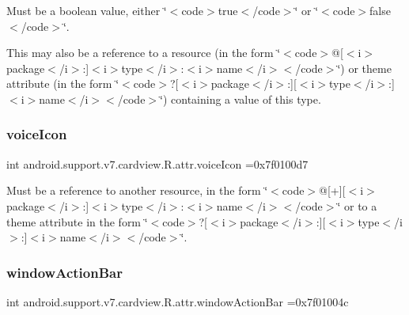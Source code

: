 Must be a boolean value, either \char`\"{}$<$code$>$true$<$/code$>$\char`\"{} or \char`\"{}$<$code$>$false$<$/code$>$\char`\"{}. 

This may also be a reference to a resource (in the form \char`\"{}$<$code$>$@\mbox{[}$<$i$>$package$<$/i$>$\+:\mbox{]}$<$i$>$type$<$/i$>$\+:$<$i$>$name$<$/i$>$$<$/code$>$\char`\"{}) or theme attribute (in the form \char`\"{}$<$code$>$?\mbox{[}$<$i$>$package$<$/i$>$\+:\mbox{]}\mbox{[}$<$i$>$type$<$/i$>$\+:\mbox{]}$<$i$>$name$<$/i$>$$<$/code$>$\char`\"{}) containing a value of this type. \mbox{\label{classandroid_1_1support_1_1v7_1_1cardview_1_1R_1_1attr_a41d30edeb1f59d1e42791fa7ce86ce17}} 
\subsubsection{\texorpdfstring{voice\+Icon}{voiceIcon}}
{\footnotesize\ttfamily int android.\+support.\+v7.\+cardview.\+R.\+attr.\+voice\+Icon =0x7f0100d7\hspace{0.3cm}{\ttfamily [static]}}

Must be a reference to another resource, in the form \char`\"{}$<$code$>$@\mbox{[}+\mbox{]}\mbox{[}$<$i$>$package$<$/i$>$\+:\mbox{]}$<$i$>$type$<$/i$>$\+:$<$i$>$name$<$/i$>$$<$/code$>$\char`\"{} or to a theme attribute in the form \char`\"{}$<$code$>$?\mbox{[}$<$i$>$package$<$/i$>$\+:\mbox{]}\mbox{[}$<$i$>$type$<$/i$>$\+:\mbox{]}$<$i$>$name$<$/i$>$$<$/code$>$\char`\"{}. \mbox{\label{classandroid_1_1support_1_1v7_1_1cardview_1_1R_1_1attr_a0bad591cfb7bcb7ff02f183bac2401fd}} 
\subsubsection{\texorpdfstring{window\+Action\+Bar}{windowActionBar}}
{\footnotesize\ttfamily int android.\+support.\+v7.\+cardview.\+R.\+attr.\+window\+Action\+Bar =0x7f01004c\hspace{0.3cm}{\ttfamily [static]}}

